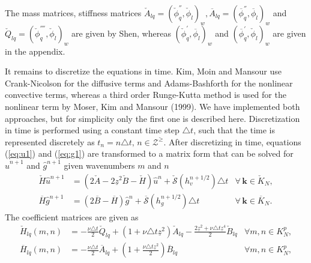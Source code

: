 \documentclass[11pt, oneside]{article}
\newcommand{\N}[1]{\check{#1}}
\newcommand{\D}[1]{\overline{#1}}
\begin{document}
The mass matrices, stiffness matrices $\N{A}_{lq} = \left( \N{\phi}_q^{''}, 
\N{\phi}_l\right)_w, 
\D{A}_{lq} = \left( \D{\phi}_q^{''}, \D{\phi}_l\right)_w 
$ and $\N{Q}_{lq} = \left(\N{\phi}^{''''}_q, \N{\phi}_l\right)_w$ are given by 
Shen, whereas $\left(\N{\phi}_q^{'}, \D{\phi}_l\right)_w$ and 
$\left(\D{\phi}_q^{'}, \N{\phi}_l\right)_w$ are given in the 
appendix.

It remains to discretize the equations in time. Kim, Moin and Mansour use 
Crank-Nicolson for the diffusive terms and Adams-Bashforth for the nonlinear 
convective terms, whereas a third order Runge-Kutta method is used for the 
nonlinear term by Moser, Kim and Mansour (1999). We have implemented both 
approaches, but for simplicity only the first one is described here. 
Discretization in time is performed using a constant time step $\triangle t$, 
such that the time is represented discretely as $t_n = n \triangle t, \, n \in 
\mathcal{Z}^{\ge}$. After 
discretizing in time, equations (\ref{eq:u1}) and (\ref{eq:g1}) are transformed 
to a matrix form that can be solved for $\hat{u}^{n+1}$ and $\hat{g}^{n+1}$ 
given wavenumbers $m$ and $n$
\begin{align}
\N{H}\hat{u}^{n+1} & = \left(2\N{A} - 2\underline{z}^2\N{B} - \N{H} 
\right)\hat{u}^{n} + \N{\mathcal{S}}(h_v^{n+1/2}) \triangle t & 
\forall \, {\bm{k}} \in \N{K}_N, 
\label{eq:ufin}\\ 
\D{H} \hat{g}^{n+1} &= \left(2 \D{B}-\D{H}\right) 
\hat{g}^{n} + \D{\mathcal{S}}(h_g^{n+1/2}) \triangle t &\forall \, 
{\bm{k}} \in 
\D{K}_N. \label{eq:gfin}
\end{align}
The coefficient matrices are given as
\begin{align}
\N{H}_{lq}(m, n) &= -\frac{\nu \triangle t}{2}\N{Q}_{lq} + \left( 1 + \nu 
\triangle t 
\underline{z}^2 \right) \N{A}_{lq} - \frac{2\underline{z}^2 + \nu \triangle t 
\underline{z}^4}{2} \N{B}_{lq} &\forall m, n \in K_N^p, \\
\D{H}_{lq}(m, n) &= -\frac{\nu \triangle 
t}{2}\D{A}_{lq} + (1 + \frac{\nu \triangle t \underline{z}^2}{2}) \D{B}_{lq} 
&\forall m, n \in K_N^p,
\end{align}
\end{document}
